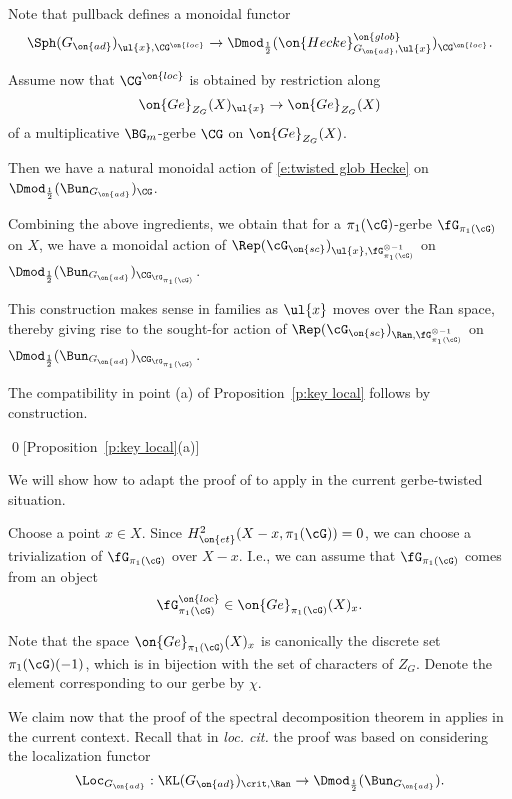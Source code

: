 \documentclass[9pt]{amsart}
\theoremstyle{remark}
\theoremstyle{definition}
\theoremstyle{remark}
\newcommand{\propref}[1]{Proposition~\ref{#1}}
\numberwithin{equation}{section}
\begin{document}
Note that pullback defines a monoidal functor
$$\Sph(G_{\on{ad}})_{\ul{x},\CG^{\on{loc}}}\to \Dmod_{\frac{1}{2}}(\on{Hecke}^{\on{glob}}_{G_{\on{ad}},\ul{x}})_{\CG^{\on{loc}}}.$$

\medskip

Assume now that $\CG^{\on{loc}}$ is obtained by restriction along
$$\on{Ge}_{Z_G}(X)_{\ul{x}}\to \on{Ge}_{Z_G}(X)$$
of a multiplicative $\BG_m$-gerbe $\CG$ on $\on{Ge}_{Z_G}(X)$. 

\medskip

Then we have a natural monoidal action of \eqref{e:twisted glob Hecke} on $\Dmod_{\frac{1}{2}}(\Bun_{G_{\on{ad}}})_\CG$.

\sssec{}

Combining the above ingredients, we obtain that for a $\pi_1(\cG)$-gerbe $\fG_{\pi_1(\cG)}$ on $X$, we have a monoidal action of 
$\Rep(\cG_{\on{sc}})_{\ul{x},\fG^{\otimes -1}_{\pi_1(\cG)}}$ on $\Dmod_{\frac{1}{2}}(\Bun_{G_{\on{ad}}})_{\CG_{\fG_{\pi_1(\cG)}}}$.

\medskip

This construction makes sense in families as $\ul{x}$ moves over the Ran space, thereby giving rise to the sought-for action of 
$\Rep(\cG_{\on{sc}})_{\Ran,\fG^{\otimes -1}_{\pi_1(\cG)}}$ on $\Dmod_{\frac{1}{2}}(\Bun_{G_{\on{ad}}})_{\CG_{\fG_{\pi_1(\cG)}}}$.

\medskip

The compatibility in point (a) of \propref{p:key local} follows by construction.

\qed[\propref{p:key local}(a)]

\ssec{Proof of \propref{p:key local}(b)} \label{ss:proof key local b} 

We will show how to adapt the proof of \cite[Theorem 4.5.2]{Ga4} to apply in the current gerbe-twisted situation. 

\sssec{}

Choose a point $x\in X$. Since $H^2_{\on{et}}(X-x,\pi_1(\cG))=0$, we can choose a trivialization of $\fG_{\pi_1(\cG)}$
over $X-x$. I.e., we can assume that $\fG_{\pi_1(\cG)}$ comes from an object
$$\fG^{\on{loc}}_{\pi_1(\cG)}\in \on{Ge}_{\pi_1(\cG)}(X)_x.$$

Note that the space $\on{Ge}_{\pi_1(\cG)}(X)_x$ is canonically the discrete set $\pi_1(\cG)(-1)$, which is in bijection with the 
set of characters of $Z_G$. Denote the element corresponding to our gerbe by $\chi$. 

\sssec{}

We claim now that the proof of the spectral decomposition theorem in \cite[Sect. 11.1]{Ga4} applies in the current context.
Recall that in {\it loc. cit.} the proof was based on considering the localization functor
$$\Loc_{G_{\on{ad}}}:\KL(G_{\on{ad}})_{\crit,\Ran}\to \Dmod_{\frac{1}{2}}(\Bun_{G_{\on{ad}}}).$$
\end{document}
